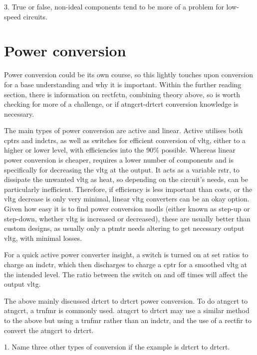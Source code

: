 \documentclass[a4paper,11pt]{report}
\newcommand{\Quiz}[1] %
{
\par\noindent %
\phantomsection %
\todo[inline, color=blue!30]{\textbf{#1}} %
\vspace{1em} %
}
\begin{document}
3. True or false, non-ideal components tend to be more of a problem for low-speed circuits.

\pagebreak

\section{Power conversion}

Power conversion could be its own course, so this lightly touches upon conversion for a base understanding and why it is important. Within the further reading section, there is information on \gls{rectfctn}, combining theory above, so is worth checking for more of a challenge, or if \gls{atngcrt}-\gls{drtcrt} conversion knowledge is necessary.

The main types of power conversion are active and linear. Active utilises both \gls{cptr}s and \gls{indctr}s, as well as switches for efficient conversion of \gls{vltg}, either to a higher or lower level, with efficiencies into the 90\% possible. Whereas linear power conversion is cheaper, requires a lower number of components and is specifically for decreasing the \gls{vltg} at the output. It acts as a variable \gls{rstr}, to dissipate the unwanted \gls{vltg} as heat, so depending on the circuit's needs, can be particularly inefficient. Therefore, if efficiency is less important than costs, or the \gls{vltg} decrease is only very minimal, linear \gls{vltg} converters can be an okay option. Given how easy it is to find power conversion \gls{modl}s (either known as step-up or step-down, whether \gls{vltg} is increased or decreased), these are usually better than custom designs, as usually only a \gls{ptmtr} needs altering to get necessary output \gls{vltg}, with minimal losses.

For a quick active power converter insight, a switch is turned on at set ratios to charge an \gls{indctr}, which then discharges to charge a \gls{cptr} for a smoothed \gls{vltg} at the intended level. The ratio between the switch on and off times will affect the output \gls{vltg}.

The above mainly discussed \gls{drtcrt} to \gls{drtcrt} power conversion. To do \gls{atngcrt} to \gls{atngcrt}, a \gls{trnfmr} is commonly used. \gls{atngcrt} to \gls{drtcrt} may use a similar method to the above but using a \gls{trnfmr} rather than an \gls{indctr}, and the use of a \gls{rectfir} to convert the \gls{atngcrt} to \gls{drtcrt}.

\Quiz{Quiz}

1. Name three other types of conversion if the example is \gls{drtcrt} to \gls{drtcrt}.
\end{document}
